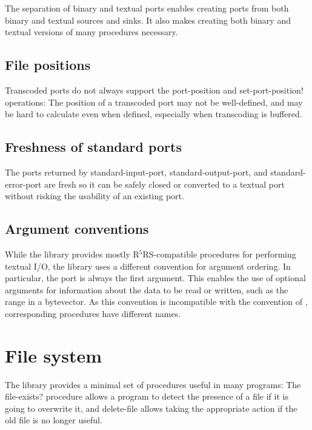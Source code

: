 \documentclass[twoside,twocolumn]{algol60}
\newcommand{\rn}[1]{R$^{#1}$RS}
\begin{document}
The separation of binary and textual ports enables creating ports from
both binary and textual sources and sinks.  It also makes creating
both binary and textual versions of many procedures
necessary.

\section{File positions}

Transcoded ports do not always support the {\cf port-\hp{}position} and
{\cf set-port-position!} operations: The position of a transcoded port
may not be well-defined, and may be hard to calculate even when
defined, especially when transcoding is buffered.

\section{Freshness of standard ports}

The ports returned by {\cf standard-input-port}, {\cf
  standard-\hp{}output-\hp{}port}, and {\cf standard-error-port} are fresh so it
can be safely closed or converted to a textual port without risking
the usability of an existing port.


\section{Argument conventions}

While the  library provides mostly
\rn{5}-compatible procedures for performing textual I/O, the
 library uses a different convention for
argument ordering.  In particular, the port is always the first
argument.  This enables the use of optional arguments for information
about the data to be read or written, such as the range in a
bytevector.  As this convention is incompatible with the convention of
, corresponding procedures have different
names.

\chapter{File system}

The  library provides a minimal set of procedures
useful in many programs: The {\cf file-exists?} procedure allows a
program to detect the presence of a file if it is going to overwrite
it, and {\cf delete-file} allows taking the appropriate action if the
old file is no longer useful.
\end{document}
